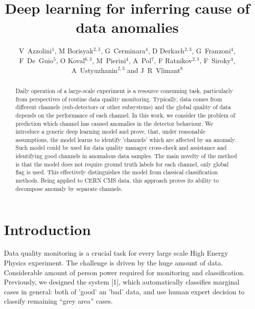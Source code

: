 \documentclass[a4paper]{jpconf}
\begin{document}
\title{Deep learning for inferring cause of data anomalies}

\author{V~Azzolini$^1$, M Borisyak$^{2,3}$, G~Cerminara$^4$, D Derkach$^{2,3}$, G~Franzoni$^4$, F~De~Guio$^5$, O Koval$^{6,3}$, M~Pierini$^4$, A~Pol$^7$, F Ratnikov$^{2,3}$, F~Siroky$^4$, A~Ustyuzhanin$^{2,3}$ and J~R~Vlimant$^8$}

\address{$^1$ Massachusetts Institute of Technology, Cambridge, USA \\
$^2$ National Research University Higher School of Economics,  Moscow, Russia \\
$^3$ Yandex School of Data Analysis, Moscow, Russia \\
$^4$ CERN, European Organization for Nuclear Research, Geneva, Switzerland \\
$^5$ Texas Tech University, Lubbock, USA \\
$^6$ Skolkovo Institute of Science and Technology, Moscow, Russia \\
$^7$ University of Paris-Saclay, Paris, France \\
$^8$ California Institute of Technology, Pasadena, USA}




\begin{abstract} 
Daily operation of a large-scale experiment is a resource consuming task, particularly from perspectives of routine data quality monitoring. Typically, data comes from different channels (sub-detectors or other subsystems) and the global quality of data depends on the performance of each channel. In this work, we consider the problem of prediction which channel has caused anomalies in the detector behaviour.
We introduce a generic deep learning model and prove, that, under reasonable assumptions, the model learns to identify 'channels' which are affected by an anomaly. Such model could be used for data quality manager cross-check and assistance and identifying good channels in anomalous data samples.
The main novelty of the method is that the model does not require ground truth labels for each channel, only global flag is used. This effectively distinguishes the model from classical classification methods. Being applied to CERN CMS data,  this approach proves its ability to decompose anomaly by separate channels. 
\end{abstract}




\section{Introduction}
Data quality monitoring is a crucial task for every large scale High Energy Physics experiment.
The challenge is driven by the huge amount of data. Considerable amount of person power
required for monitoring and classification. Previously, we designed the system [1], which automatically classifies marginal cases in general: both of 'good' an 'bad' data, and use human expert decision to classify remaining “grey area” cases. 
\end{document}
